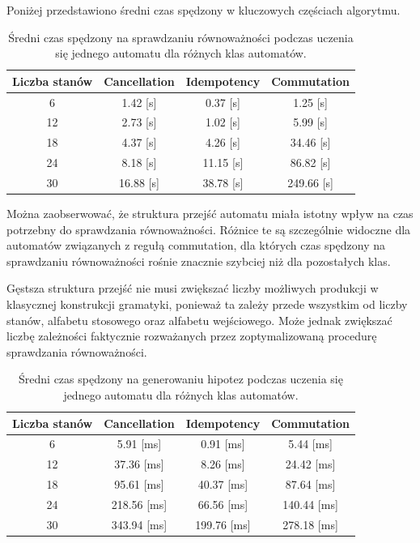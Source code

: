 Poniżej przedstawiono średni czas spędzony w kluczowych częściach algorytmu.

\begin{table}[h]
    \centering
    \begin{tabular}{c|ccc}
        \hline
        Liczba stanów & Cancellation & Idempotency & Commutation \\
        \hline
        6 & 1.42 [s] & 0.37 [s] & 1.25 [s] \\
        12 & 2.73 [s] & 1.02 [s] & 5.99 [s] \\
        18 & 4.37 [s] & 4.26 [s] & 34.46 [s] \\
        24 & 8.18 [s] & 11.15 [s] & 86.82 [s] \\
        30 & 16.88 [s] & 38.78 [s] & 249.66 [s] \\
        \hline
    \end{tabular}
    \caption{Średni czas spędzony na sprawdzaniu równoważności podczas uczenia się jednego automatu dla różnych klas automatów.}
\end{table}

\FloatBarrier

Można zaobserwować, że struktura przejść automatu miała istotny wpływ na czas potrzebny do sprawdzania równoważności.
Różnice te są szczególnie widoczne dla automatów związanych z regułą commutation, dla których czas spędzony na sprawdzaniu
równoważności rośnie znacznie szybciej niż dla pozostałych klas.

Gęstsza struktura przejść nie musi zwiększać liczby możliwych produkcji w klasycznej konstrukcji gramatyki,
ponieważ ta zależy przede wszystkim od liczby stanów, alfabetu stosowego oraz alfabetu wejściowego.
Może jednak zwiększać liczbę zależności faktycznie rozważanych przez zoptymalizowaną procedurę sprawdzania równoważności.

\begin{table}[h]
    \centering
    \begin{tabular}{c|ccc}
        \hline
        Liczba stanów & Cancellation & Idempotency & Commutation \\
        \hline
        6 & 5.91 [ms] & 0.91 [ms] & 5.44 [ms] \\
        12 & 37.36 [ms] & 8.26 [ms] & 24.42 [ms] \\
        18 & 95.61 [ms] & 40.37 [ms] & 87.64 [ms] \\
        24 & 218.56 [ms] & 66.56 [ms] & 140.44 [ms] \\
        30 & 343.94 [ms] & 199.76 [ms] & 278.18 [ms] \\
        \hline
    \end{tabular}
    \caption{Średni czas spędzony na generowaniu hipotez podczas uczenia się jednego automatu dla różnych klas automatów.}
\end{table}


